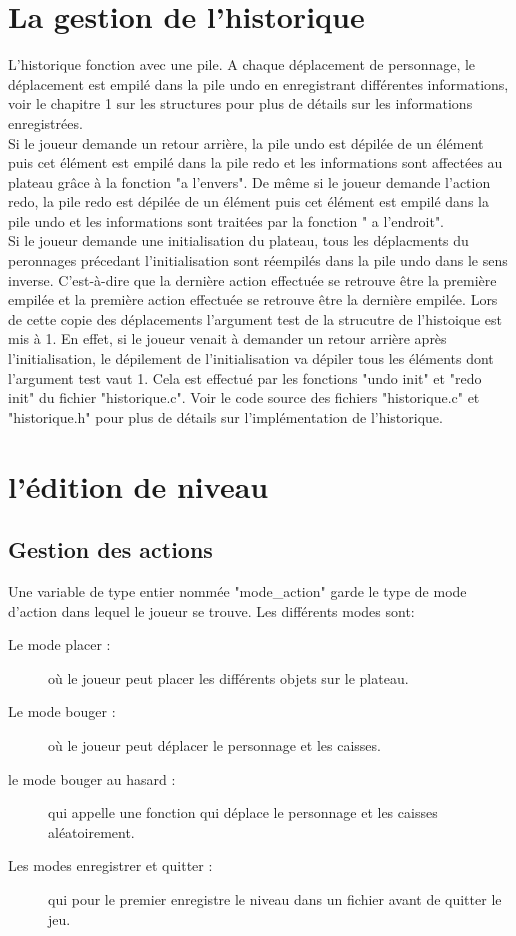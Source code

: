 \documentclass{report}
\begin{document}
	\chapter{La gestion de l'historique}
L'historique fonction avec une pile. A chaque déplacement de personnage, le déplacement est empilé dans la pile undo en enregistrant différentes informations, voir le chapitre 1 sur les structures pour plus de détails sur les informations enregistrées.\\
Si le joueur demande un retour arrière, la pile undo est dépilée de un élément puis cet élément est empilé dans la pile redo et les informations sont affectées au plateau grâce à la fonction "a l'envers".
De même si le joueur demande l'action redo, la pile redo est dépilée de un élément puis cet élément est empilé dans la pile undo et les informations sont traitées par la fonction " a l'endroit".\\
Si le joueur demande une initialisation du plateau, tous les déplacments du peronnages précedant l'initialisation sont réempilés dans la pile undo dans le sens inverse. C'est-à-dire que la dernière action effectuée se retrouve être la première empilée et la première action effectuée se retrouve être la dernière empilée.
Lors de cette copie des déplacements l'argument test de la strucutre de l'histoique est mis à 1.
En effet, si le joueur venait à demander un retour arrière après l'initialisation, le dépilement de l'initialisation va dépiler tous les éléments dont l'argument test vaut 1. Cela est effectué par les fonctions "undo init" et "redo init" du fichier "historique.c".
Voir le code source des fichiers "historique.c" et "historique.h" pour plus de détails sur l'implémentation de l'historique.
	
	\chapter{l'édition de niveau}
		\section{Gestion des actions}
Une variable de type entier nommée "mode\_action" garde le type de mode d'action dans lequel le joueur se trouve. Les différents modes sont:
\begin{description}
\item[Le mode placer :]où le joueur peut placer les différents objets sur le plateau.
\item[Le mode bouger :]où le joueur peut déplacer le personnage et les caisses.
\item[le mode bouger au hasard :]qui appelle une fonction qui déplace le personnage et les caisses aléatoirement.
\item[Les modes enregistrer et quitter :] qui pour le premier enregistre le niveau dans un fichier avant de quitter le jeu.
\end{description}
\end{document}

